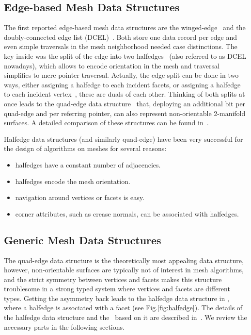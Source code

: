 \subsection{Edge-based Mesh Data Structures}

The first reported edge-based mesh data structures are the
winged-edge~\cite{Baumgart:1975:PRCV} and the doubly-connected edge
list (DCEL)~\cite{Muller78}. Both store one data record per edge and
even simple traversals in the mesh neighborhood needed case
distinctions. The key inside was the split of the edge into two
halfedges~\cite{Weiler85,Maentylae88} (also referred to as DCEL
nowadays), which allows to encode orientation in the mesh and
traversal simplifies to mere pointer traversal. Actually, the edge
split can be done in two ways, either assigning a halfedge to each
incident facets, or assigning a halfedge to each incident
vertex~\cite{Weiler85}, these are duals of each other. Thinking of
both splits at once leads to the quad-edge data 
structure~\cite{Guibas:1983:PMG} that, deploying an additional bit per
quad-edge and per referring pointer, can also represent non-orientable
2-manifold surfaces. A detailed comparison of these structures can be
found in~\cite{k-ugpdd-99}.

Halfedge data structures (and similarly quad-edge) have been very
successful for the design of algorithms on meshes for several reasons:
\begin{itemize}
\item halfedges have a constant number of adjacencies. 
\item halfedges encode the mesh orientation.
\item navigation around vertices or facets is easy.
\item corner attributes, such as crease normals, can be associated
      with halfedges.
\end{itemize}


\subsection{Generic Mesh Data Structures}

The quad-edge data structure is the theoretically most appealing data
structure, however, non-orientable surfaces are typically not of interest in
mesh algorithms, and the strict symmetry between vertices and facets
makes this structure troublesome in a strong typed system where
vertices and facets are different types. Getting the asymmetry back
leads to the halfedge data structure in \cgal, where a halfedge is 
associated with a facet (see Fig.\ref{fig:halfedge}). The details
of the halfedge data structure and the \cgalpoly\ based on it are
described in~\cite{k-ugpdd-99}. We review the necessary parts in the
following sections.

